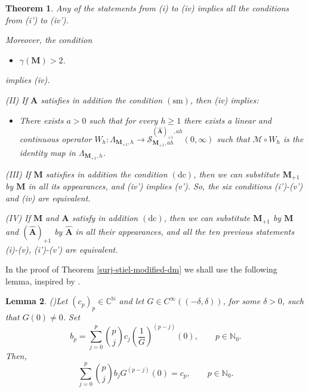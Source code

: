 \documentclass[12pt,a4paper]{article}
\newcommand{\N}{\mathbb{N}}
\newcommand{\C}{\mathbb{C}}
\newcommand{\M}{{\boldsymbol{M}}}
\newcommand{\A}{{\boldsymbol{A}}}
\newcommand{\hA}{\widehat{{\boldsymbol{A}}}}
\newcommand{\dc}{\operatorname{(dc)}}
\newcommand{\sm}{\operatorname{(sm)}}
\newcommand{\ga}{\gamma}
\theoremstyle{plain}
\newtheorem{theorem}{Theorem}[section]
\newtheorem{lemma}[theorem]{Lemma}
\theoremstyle{definition}
\numberwithin{equation}{section}
\begin{document}
\begin{theorem}
Any of the statements from (i) to (iv) implies all the conditions from (i') to (iv').\par\noindent
Moreover, the condition
\begin{itemize}
\item[$(v')$] $\ga(\M)>2$.
\end{itemize}
implies (iv).\par\noindent
(II) If $\A$ satisfies in addition the condition $\sm$, then (iv) implies:
\begin{itemize}
\item[$(v)$] There exists $a>0$ such that for every $h\ge 1$ there exists a linear and continuous operator $W_h\colon \Lambda_{\M_{+1},h}\to \mathcal{S}^{(\hA)_{+1},ah}_{\M_{+1},ah}(0,\infty)$ such that $\mathcal{M}\circ W_h$ is the identity map in $\Lambda_{\M_{+1},h}$.
\end{itemize}
\par\noindent
(III) If $\M$ satisfies in addition the condition $\dc$, then we can substitute $\M_{+1}$ by $\M$ in all its appearances, and (iv') implies (v'). So, the six conditions (i')-(v') and (iv) are equivalent.\par\noindent
(IV) If $\M$ and $\A$ satisfy in addition $\dc$, then we can substitute $\M_{+1}$ by $\M$ and $(\hA)_{+1}$ by $\hA$ in all their appearances, and all the ten previous statements (i)-(v), (i')-(v') are equivalent.
\end{theorem}

In the proof of Theorem \ref{surj-stiel-modified-dm} we shall use the following lemma, inspired by \cite{D-E}.
\begin{lemma}(\cite[Lemma 3.6]{DebrouwereetalMoment})\label{inversion-dm}
Let $(c_p)_p \in \C^\N$ and let $G \in C^\infty((-\delta,\delta))$, for some $\delta > 0$, such that $G(0) \neq 0$. Set
$$
b_p = \sum_{j = 0}^p \binom{p}{j} c_j \left ( \frac{1}{G} \right)^{(p-j)} (0), \qquad p \in \N_0.
$$
Then,
$$
\sum_{j=0}^p \binom{p}{j} b_j G^{(p-j)}(0) = c_p, \qquad p\in \N_0.
$$
\end{lemma}
\end{document}
